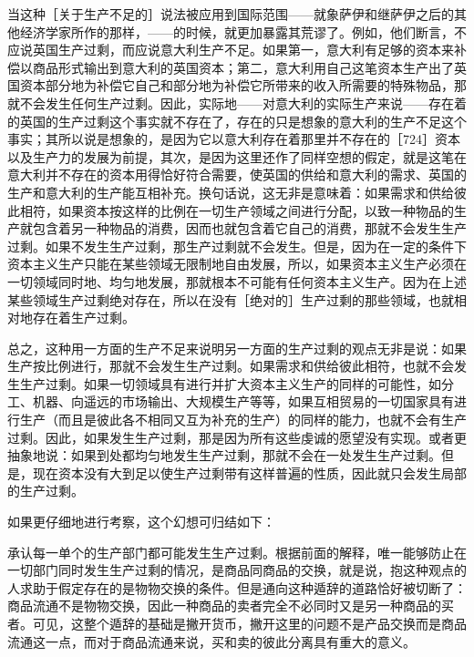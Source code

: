 当这种［关于生产不足的］说法被应用到国际范围——就象萨伊和继萨伊之后的其他经济学家所作的那样，——的时候，就更加暴露其荒谬了。例如，他们断言，不应说英国生产过剩，而应说意大利生产不足。如果第一，意大利有足够的资本来补偿以商品形式输出到意大利的英国资本；第二，意大利用自己这笔资本生产出了英国资本部分地为补偿它自己和部分地为补偿它所带来的收入所需要的特殊物品，那就不会发生任何生产过剩。因此，实际地——对意大利的实际生产来说——存在着的英国的生产过剩这个事实就不存在了，存在的只是想象的意大利的生产不足这个事实；其所以说是想象的，是因为它以意大利存在着那里并不存在的［724］资本以及生产力的发展为前提，其次，是因为这里还作了同样空想的假定，就是这笔在意大利并不存在的资本用得恰好符合需要，使英国的供给和意大利的需求、英国的生产和意大利的生产能互相补充。换句话说，这无非是意味着：如果需求和供给彼此相符，如果资本按这样的比例在一切生产领域之间进行分配，以致一种物品的生产就包含着另一种物品的消费，因而也就包含着它自己的消费，那就不会发生生产过剩。如果不发生生产过剩，那生产过剩就不会发生。但是，因为在一定的条件下资本主义生产只能在某些领域无限制地自由发展，所以，如果资本主义生产必须在一切领域同时地、均匀地发展，那就根本不可能有任何资本主义生产。因为在上述某些领域生产过剩绝对存在，所以在没有［绝对的］生产过剩的那些领域，也就相对地存在着生产过剩。

总之，这种用一方面的生产不足来说明另一方面的生产过剩的观点无非是说：如果生产按比例进行，那就不会发生生产过剩。如果需求和供给彼此相符，也就不会发生生产过剩。如果一切领域具有进行并扩大资本主义生产的同样的可能性，如分工、机器、向遥远的市场输出、大规模生产等等，如果互相贸易的一切国家具有进行生产（而且是彼此各不相同又互为补充的生产）的同样的能力，也就不会有生产过剩。因此，如果发生生产过剩，那是因为所有这些虔诚的愿望没有实现。或者更抽象地说：如果到处都均匀地发生生产过剩，那就不会在一处发生生产过剩。但是，现在资本没有大到足以使生产过剩带有这样普遍的性质，因此就只会发生局部的生产过剩。

如果更仔细地进行考察，这个幻想可归结如下：

承认每一单个的生产部门都可能发生生产过剩。根据前面的解释，唯一能够防止在一切部门同时发生生产过剩的情况，是商品同商品的交换，就是说，抱这种观点的人求助于假定存在的是物物交换的条件。但是通向这种遁辞的道路恰好被切断了：商品流通不是物物交换，因此一种商品的卖者完全不必同时又是另一种商品的买者。可见，这整个遁辞的基础是撇开货币，撇开这里的问题不是产品交换而是商品流通这一点，而对于商品流通来说，买和卖的彼此分离具有重大的意义。

